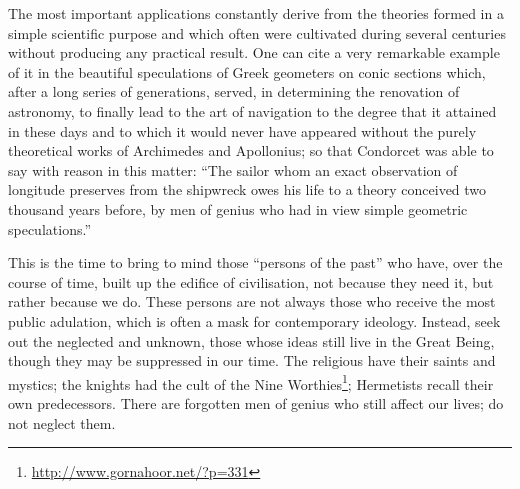 \begin{quotex}
The most important applications constantly derive from the theories formed in a simple scientific purpose and which often were cultivated during several centuries without producing any practical result. One can cite a very remarkable example of it in the beautiful speculations of Greek geometers on conic sections which, after a long series of generations, served, in determining the renovation of astronomy, to finally lead to the art of navigation to the degree that it attained in these days and to which it would never have appeared without the purely theoretical works of Archimedes and Apollonius; so that Condorcet was able to say with reason in this matter: ``The sailor whom an exact observation of longitude preserves from the shipwreck owes his life to a theory conceived two thousand years before, by men of genius who had in view simple geometric speculations.''
\end{quotex}


This is the time to bring to mind those ``persons of the past'' who have, over the course of time, built up the edifice of civilisation, not because they need it, but rather because we do. These persons are not always those who receive the most public adulation, which is often a mask for contemporary ideology. Instead, seek out the neglected and unknown, those whose ideas still live in the Great Being, though they may be suppressed in our time. The religious have their saints and mystics; the knights had the cult of the Nine Worthies\footnote{\url{http://www.gornahoor.net/?p=331}}; Hermetists recall their own predecessors. There are forgotten men of genius who still affect our lives; do not neglect them.



